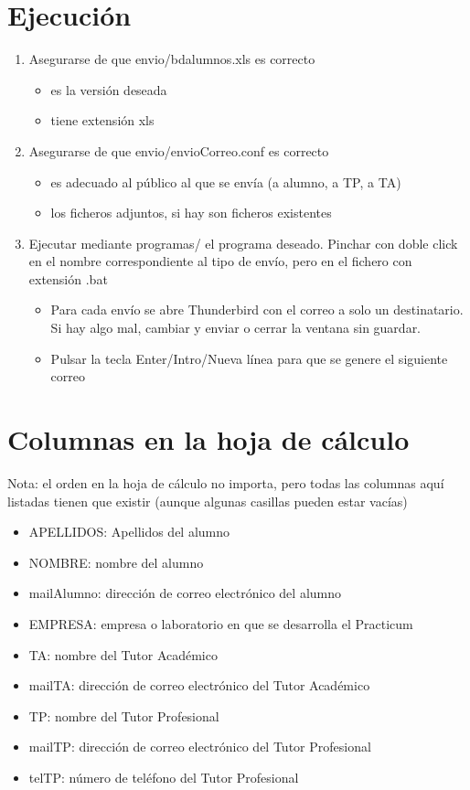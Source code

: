 \documentclass[11pt]{article}
\begin{document}
\section{Ejecución}
\label{sec-2}
\begin{enumerate}
\item Asegurarse de que envio/bdalumnos.xls es correcto
\begin{itemize}
\item es la versión deseada
\item tiene extensión xls
\end{itemize}
\item Asegurarse de que envio/envioCorreo.conf es correcto
\begin{itemize}
\item es adecuado al público al que se envía (a alumno, a TP, a TA)
\item los ficheros adjuntos, si hay son ficheros existentes
\end{itemize}
\item Ejecutar mediante programas/ el programa deseado. Pinchar con doble click en el nombre correspondiente al tipo de envío, pero en el fichero con extensión .bat
\begin{itemize}
\item Para cada envío se abre Thunderbird con el correo a solo un destinatario. Si hay algo mal, cambiar y enviar o cerrar la ventana sin guardar.
\item Pulsar la tecla Enter/Intro/Nueva línea para que se genere el siguiente correo
\end{itemize}
\end{enumerate}

\section{Columnas en la hoja de cálculo}
\label{sec-3}
Nota: el orden en la hoja de cálculo no importa, pero todas las columnas aquí listadas tienen que existir (aunque algunas casillas pueden estar vacías)
\begin{itemize}
\item APELLIDOS: Apellidos del alumno
\item NOMBRE: nombre del alumno
\item mailAlumno: dirección de correo electrónico del alumno
\item EMPRESA: empresa o laboratorio en que se desarrolla el Practicum
\item TA: nombre del Tutor Académico
\item mailTA: dirección de correo electrónico del Tutor Académico
\item TP: nombre del Tutor Profesional
\item mailTP: dirección de correo electrónico del Tutor Profesional
\item telTP: número de teléfono del Tutor Profesional
\end{itemize}
\end{document}
